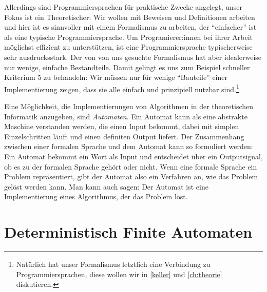 Allerdings sind Programmiersprachen für praktische Zwecke angelegt,
unser Fokus ist ein Theoretischer:
Wir wollen mit Beweisen und Definitionen arbeiten
und hier ist es sinnvoller mit einem Formalismus zu arbeiten,
der ``einfacher'' ist als eine typische Programmiersprache.
Um Programierer:innen bei ihrer Arbeit möglichst effizient zu unterstützen,
ist eine Programmiersprache typischerweise sehr ausdrucksstark.
Der von von uns gesuchte Formalismus hat aber idealerweise nur wenige, einfache Bestandteile.
Damit gelingt es uns zum Beispiel schneller Kriterium 5 zu behandeln:
Wir müssen nur für wenige ``Bauteile'' einer Implementierung zeigen,
dass sie alle einfach und prinzipiell nutzbar sind.\footnote{
    Natürlich hat unser Formalismus letztlich eine Verbindung zu Programmiersprachen,
    diese wollen wir in \autoref{keller} und \autoref{ch:theorie} diskutieren.
}

Eine Möglichkeit,
die Implementierungen von Algorithmen in der theoretischen Informatik
anzugeben, sind \emph{Automaten}.
Ein Automat kann als eine abstrakte Maschine verstanden werden,
die einen Input bekommt, 
dabei mit simplen Einzelschritten läuft
und einen definiten Output liefert.
Der Zusammenhang zwischen einer formalen Sprache und dem Automat kann so formuliert werden:
Ein Automat bekommt ein Wort als Input und entscheidet über ein Outputsignal,
ob es zu der formalen Sprache gehört oder nicht.
Wenn eine formale Sprache ein Problem repräsentiert,
gibt der Automat also ein Verfahren an, 
wie das Problem gelöst werden kann.
Man kann auch sagen:
Der Automat ist eine Implementierung eines Algorithmus,
der das Problem löst.

\section{Deterministisch Finite Automaten}

